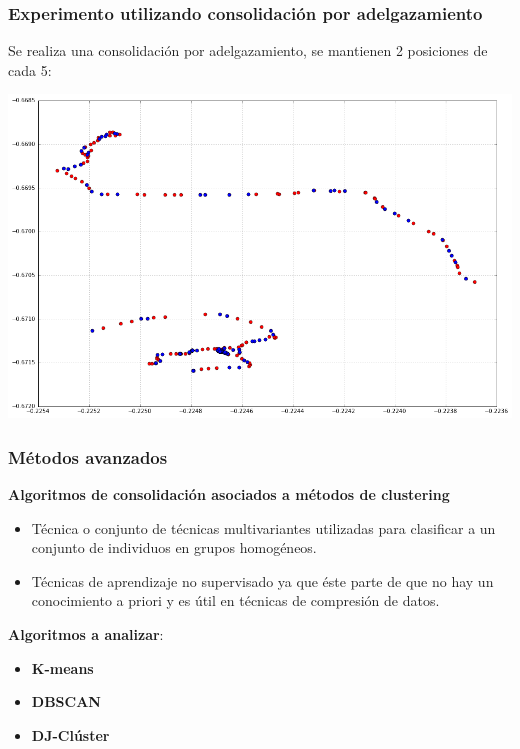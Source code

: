 \documentclass[10pt, spanish]{beamer}
\begin{document}
\begin{frame}[fragile]
\frametitle{Experimento utilizando consolidaci\'on por adelgazamiento}
Se realiza una consolidaci\'on por adelgazamiento, se mantienen 2 posiciones de cada 5:\\

\bigskip

\begin{center}
	\includegraphics[scale=.3]{thinningSuj1.png}
\end{center}

\end{frame}



\begin{frame}[fragile]
\frametitle{M\'etodos avanzados}

\textbf{Algoritmos de consolidaci\'on asociados a m\'etodos de clustering}\\

\begin{itemize}
   \item T\'ecnica o conjunto de t\'ecnicas multivariantes utilizadas para clasificar a un conjunto de individuos en grupos homog\'eneos.
   \item T\'ecnicas de aprendizaje no supervisado ya que \'este parte de que no hay un conocimiento a priori y es \'util en t\'ecnicas de compresi\'on de datos.
\end{itemize}

\textbf{Algoritmos a analizar}:\\
\begin{itemize}
\item \textbf{K-means}
\item \textbf{DBSCAN}
\item \textbf{DJ-Cl\'uster}
\end{itemize}

\end{frame}
\end{document}
